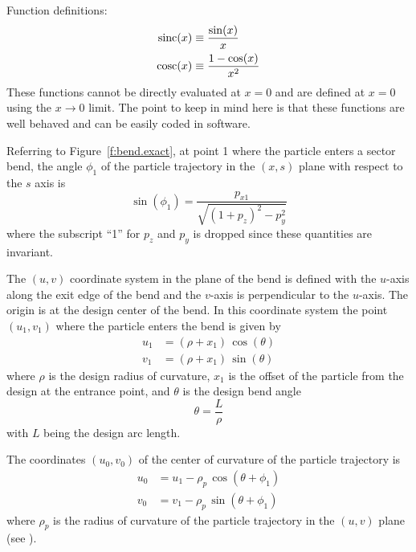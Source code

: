 Function definitions:
\begin{align}
  \text{sinc}(x) &\equiv \frac{\sin(x)}{x} \\
  \text{cosc}(x) &\equiv \frac{1 - \cos(x)}{x^2}
\end{align}
These functions cannot be directly evaluated at $x = 0$ and are defined at $x = 0$ using the $x
\rightarrow 0$ limit. The point to keep in mind here is that these functions are well behaved and
can be easily coded in software.

Referring to Figure~\ref{f:bend.exact}, at point 1 where the particle enters a sector bend, the angle
$\phi_1$ of the particle trajectory in the $(x,s)$ plane with respect to the $s$ axis is
\begin{equation}
  \sin(\phi_1) = \frac{p_{x1}}{\sqrt{(1+p_z)^2 - p_y^2}}
\end{equation}
where the subscript ``1'' for $p_z$ and $p_y$ is dropped since these quantities are invariant.

The $(u,v)$ coordinate system in the plane of the bend is defined with the $u$-axis along the exit
edge of the bend and the $v$-axis is perpendicular to the $u$-axis. The origin is at the design
center of the bend. In this coordinate system the point $(u_1, v_1)$ where the particle enters the
bend is given by
\begin{align}
  u_1 &= (\rho + x_1) \, \cos(\theta) \\
  v_1 &= (\rho + x_1) \, \sin(\theta)
\end{align}
where $\rho$ is the design radius of curvature, $x_1$ is the offset of the particle from the design
at the entrance point, and $\theta$ is the design bend angle
\begin{equation}
  \theta = \frac{L}{\rho}
\end{equation}
with $L$ being the design arc length.

The coordinates $(u_0, v_0)$ of the center of curvature of the particle trajectory is
\begin{align}
  u_0 &= u_1 - \rho_p \, \cos(\theta + \phi_1) \\
  v_0 &= v_1 - \rho_p \, \sin(\theta + \phi_1)
\end{align}
where $\rho_p$ is the radius of curvature of the particle trajectory in the $(u, v)$ plane (see
).

